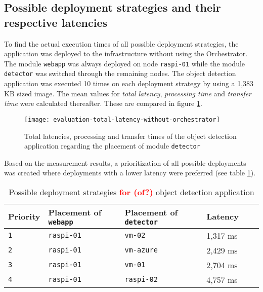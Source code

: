 \subsection{Possible deployment strategies and their respective latencies\label{sec:eval-possible-deployments}}
To find the actual execution times of all possible deployment strategies, the application was deployed to the infrastructure without using the Orchestrator.
The module \texttt{webapp} was always deployed on node \texttt{raspi-01} while the module \texttt{detector} was switched through the remaining nodes.
The object detection application was executed 10 times on each deployment strategy by using a 1,383 KB sized image.
The mean values for \textit{total latency}, \textit{processing time} and \textit{transfer time} were calculated thereafter. These are compared in figure \ref{fig:evaluation-total-latency-without-orchestrator}.

\begin{figure}[h!]
    \centering
    \texttt{[image: evaluation-total-latency-without-orchestrator]}
    \caption{Total latencies, processing and transfer times of the object detection application regarding the placement of module \texttt{detector}}
    \label{fig:evaluation-total-latency-without-orchestrator}
\end{figure}

Based on the measurement results, a prioritization of all possible deployments was created where deployments with a lower latency were preferred (see table \ref{tab:deployment-strategies-prios}).
\begin{table}[h!tb]
    \centering
    \begin{tabular}{|l|l|l|l|l|l|}
    \hline
        \textbf{Priority} & \textbf{Placement of \texttt{webapp}} & \textbf{Placement of \texttt{detector}} & \textbf{Latency} \\
         \hline
         \texttt{1} & \texttt{raspi-01} & \texttt{vm-02} & 1,317 ms\\
         \hline
         \texttt{2} & \texttt{raspi-01} & \texttt{vm-azure} & 2,429 ms\\
         \hline
         \texttt{3} & \texttt{raspi-01} & \texttt{vm-01} & 2,704 ms\\
         \hline
         \texttt{4} & \texttt{raspi-01} & \texttt{raspi-02} & 4,757 ms\\
         \hline
    \end{tabular}
    \caption{Possible deployment strategies \textcolor{red}{\textbf{for (of?)}} object detection application}
    \label{tab:deployment-strategies-prios}
\end{table}

